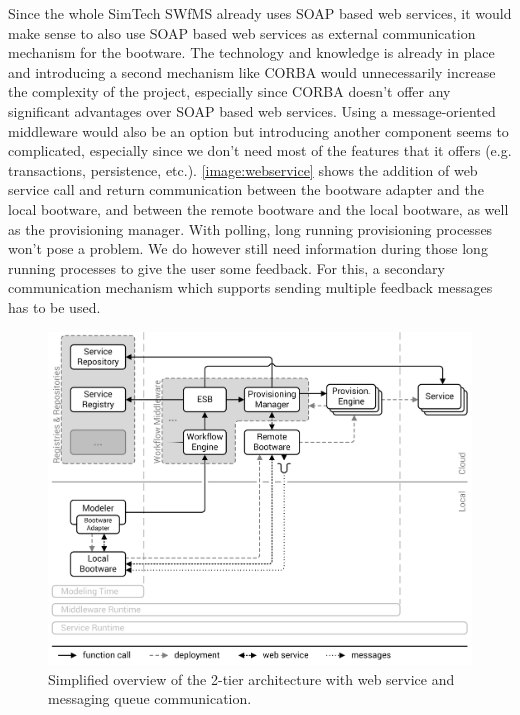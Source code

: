 Since the whole SimTech SWfMS already uses SOAP based web services, it would make sense to also use SOAP based web services as external communication mechanism for the bootware.
The technology and knowledge is already in place and introducing a second mechanism like CORBA would unnecessarily increase the complexity of the project, especially since CORBA doesn't offer any significant advantages over SOAP based web services.
Using a message-oriented middleware would also be an option but introducing another component seems to complicated, especially since we don't need most of the features that it offers (e.g. transactions, persistence, etc.).
\autoref{image:webservice} shows the addition of web service call and return communication between the bootware adapter and the local bootware, and between the remote bootware and the local bootware, as well as the provisioning manager.
With polling, long running provisioning processes won't pose a problem.
We do however still need information during those long running processes to give the user some feedback.
For this, a secondary communication mechanism which supports sending multiple feedback messages has to be used.

\begin{figure}[!htbp]
	\centering
	\includegraphics[resolution=600]{design/assets/message_queue}
	\caption{Simplified overview of the 2-tier architecture with web service and messaging queue communication.}
	\label{image:message_queue}
\end{figure}

